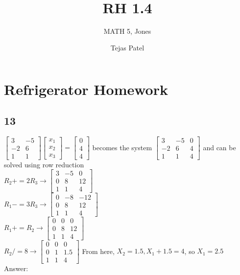 \documentclass{article}
\title{RH 1.4}
\author{MATH 5, Jones}
\date{Tejas Patel}
\begin{document}
\maketitle
\section*{Refrigerator Homework}
\subsection*{13}
$\begin{bmatrix}
    3&-5\\-2&6\\1&1
\end{bmatrix}\begin{bmatrix}
    x_1\\x_2\\x_3
\end{bmatrix} = \begin{bmatrix}
    0\\4\\4
\end{bmatrix}$ becomes the system 
$\begin{bmatrix}
    3&-5&0\\-2&6&4\\1&1&4
\end{bmatrix}$ and can be solved using row reduction
\\[0.1in] $R_2+=2R_3\rightarrow \begin{bmatrix}
    3&-5&0\\0&8&12\\1&1&4
\end{bmatrix}$
\\[0.1in] $R_1-=3R_3 \rightarrow
\begin{bmatrix}
    0&-8&-12\\0&8&12\\1&1&4
\end{bmatrix}$
\\[0.1in]$ R_1 += R_2 \rightarrow \begin{bmatrix}
    0&0&0\\0&8&12\\1&1&4
\end{bmatrix}$
\\[0.1in] $R_2 /= 8 \rightarrow \begin{bmatrix}
    0&0&0\\0&1&1.5\\1&1&4
\end{bmatrix}$ From here, $X_2=1.5, X_1+1.5=4$, so $X_1=2.5$
\\[0.1in]Answer: 
\end{document}
